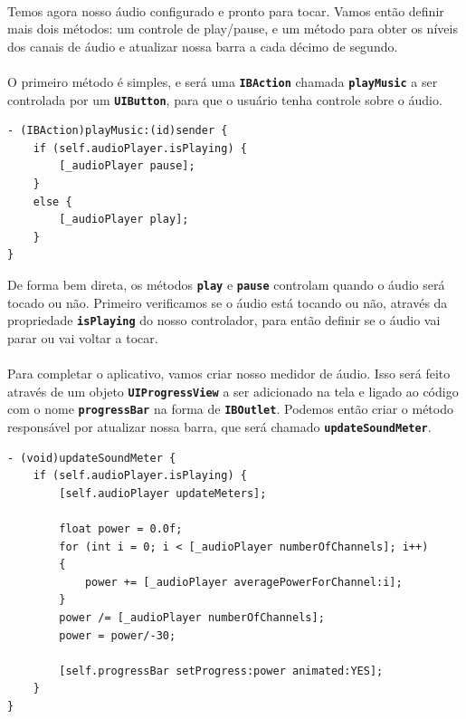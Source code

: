 \documentclass[a4paper,12pt,brazil,doubleside]{book}
\begin{document}
\paragraph{}Temos agora nosso áudio configurado e pronto para tocar. Vamos então definir mais dois métodos: um controle de play/pause, e um método para obter os níveis dos canais de áudio e atualizar nossa barra a cada décimo de segundo.
\paragraph{}O primeiro método é simples, e será uma \texttt{\textbf{IBAction}} chamada \texttt{\textbf{playMusic}} a ser controlada por um \texttt{\textbf{UIButton}}, para que o usuário tenha controle sobre o áudio.

\begin{listing}
\begin{verbatim}
- (IBAction)playMusic:(id)sender {
    if (self.audioPlayer.isPlaying) {
        [_audioPlayer pause];
    }
    else {
        [_audioPlayer play];
    }
}
\end{verbatim}
\end{listing}

De forma bem direta, os métodos \texttt{\textbf{play}} e \texttt{\textbf{pause}} controlam quando o áudio será tocado ou não. Primeiro verificamos se o áudio está tocando ou não, através da propriedade \texttt{\textbf{isPlaying}} do nosso controlador, para então definir se o áudio vai parar ou vai voltar a tocar.
\paragraph{}Para completar o aplicativo, vamos criar nosso medidor de áudio. Isso será feito através de um objeto \texttt{\textbf{UIProgressView}} a ser adicionado na tela e ligado ao código com o nome \texttt{\textbf{progressBar}} na forma de \texttt{\textbf{IBOutlet}}. Podemos então criar o método responsável por atualizar nossa barra, que será chamado \texttt{\textbf{updateSoundMeter}}.

\begin{listing}
\begin{verbatim}
- (void)updateSoundMeter {
    if (self.audioPlayer.isPlaying) {
        [self.audioPlayer updateMeters];
    
        float power = 0.0f;
        for (int i = 0; i < [_audioPlayer numberOfChannels]; i++)
        {
            power += [_audioPlayer averagePowerForChannel:i];
        }
        power /= [_audioPlayer numberOfChannels];
        power = power/-30;
        
        [self.progressBar setProgress:power animated:YES];
    }
}
\end{verbatim}
\end{listing}
\end{document}

